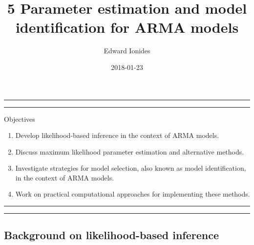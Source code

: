 \documentclass[]{article}
\title{5 Parameter estimation and model identification for ARMA models}
\author{Edward Ionides}
\date{2018-01-23}
\begin{document}
\maketitle

{
\setcounter{tocdepth}{2}
\tableofcontents
}
\newcommand\prob{\mathbb{P}}
\newcommand\E{\mathbb{E}}
\newcommand\var{\mathrm{Var}}
\newcommand\cov{\mathrm{Cov}}
\newcommand\loglik{\ell}
\newcommand\R{\mathbb{R}}
\newcommand\data[1]{#1^*}
\newcommand\estimate[1]{\data{#1}}
\newcommand\params{\, ; \,}
\newcommand\transpose{\scriptsize{T}}
\newcommand\eqspace{\quad\quad\quad}
\newcommand\lik{\mathcal{L}}
\newcommand\profileloglik[1]{\ell^\mathrm{profile}_#1}
\newcommand\ar{\phi}
\newcommand\ma{\psi}




\begin{center}\rule{0.5\linewidth}{\linethickness}\end{center}

\begin{center}\rule{0.5\linewidth}{\linethickness}\end{center}

Objectives

\begin{enumerate}
\def\labelenumi{\arabic{enumi}.}
\item
  Develop likelihood-based inference in the context of ARMA models.
\item
  Discuss maximum likelihood parameter estimation and alternative
  methods.
\item
  Investigate strategies for model selection, also known as model
  identification, in the context of ARMA models.
\item
  Work on practical computational approaches for implementing these
  methods.
\end{enumerate}

\begin{center}\rule{0.5\linewidth}{\linethickness}\end{center}

\begin{center}\rule{0.5\linewidth}{\linethickness}\end{center}

\subsection{Background on likelihood-based
inference}\label{background-on-likelihood-based-inference}
\end{document}
